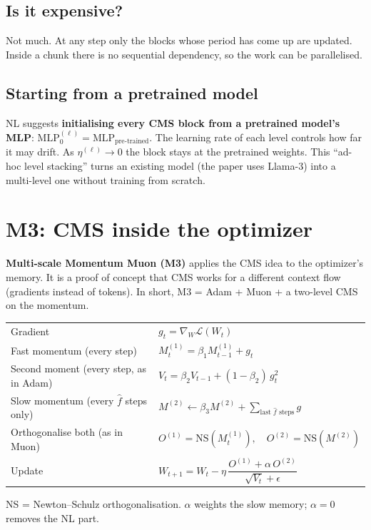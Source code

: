 \documentclass[11pt,a4paper]{article}
\newcommand{\Lc}{\mathcal{L}}
\begin{document}
\subsection{Is it expensive?}
Not much. At any step only the blocks whose period has come up are updated. Inside a chunk there is no sequential dependency, so the work can be parallelised.

\subsection{Starting from a pretrained model}
NL suggests \textbf{initialising every CMS block from a pretrained model's MLP}: $\mathrm{MLP}^{(\ell)}_0 = \mathrm{MLP}_{\text{pre-trained}}$. The learning rate of each level controls how far it may drift. As $\eta^{(\ell)}\to 0$ the block stays at the pretrained weights. This ``ad-hoc level stacking'' turns an existing model (the paper uses Llama-3) into a multi-level one without training from scratch.

\section{M3: CMS inside the optimizer}\label{sec:m3}

\textbf{Multi-scale Momentum Muon (M3)} applies the CMS idea to the optimizer's memory. It is a proof of concept that CMS works for a different context flow (gradients instead of tokens). In short, M3 = Adam + Muon + a two-level CMS on the momentum.

\begin{tcolorbox}[colback=gray!4,colframe=gray!60,title=\textbf{M3, one step for a weight matrix $W$} (paper's Algorithm~1),fonttitle=\small,boxrule=0.5pt,arc=2pt]
\small
\begin{tabular}{@{}ll@{}}
Gradient & $g_t = \nabla_W \Lc(W_t)$\\
Fast momentum (every step) & $M^{(1)}_t = \beta_1 M^{(1)}_{t-1} + g_t$\\
Second moment (every step, as in Adam) & $V_t = \beta_2 V_{t-1} + (1-\beta_2)\,g_t^{2}$\\
Slow momentum (every $\hat f$ steps only) & $M^{(2)} \leftarrow \beta_3 M^{(2)} + \sum_{\text{last }\hat f\text{ steps}} g$\\
Orthogonalise both (as in Muon) & $O^{(1)} = \mathrm{NS}(M^{(1)}_t),\quad O^{(2)} = \mathrm{NS}(M^{(2)})$\\
Update & $W_{t+1} = W_t - \eta\,\dfrac{O^{(1)} + \alpha\,O^{(2)}}{\sqrt{V_t}+\epsilon}$
\end{tabular}

\smallskip
NS = Newton--Schulz orthogonalisation. $\alpha$ weights the slow memory; $\alpha=0$ removes the NL part.
\end{tcolorbox}
\end{document}
